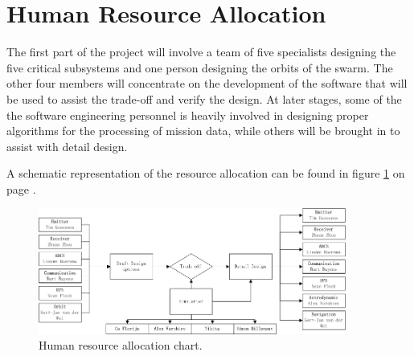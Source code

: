 \section{Human Resource Allocation}
\label{DDHR}
The first part of the project will involve a team of five specialists designing the five critical subsystems and one person designing the orbits of the swarm. The other four members will concentrate on the development of the software that will be used to assist the trade-off and verify the design. At later stages, some of the the software engineering personnel is heavily involved in designing proper algorithms for the processing of mission data, while others will be brought in to assist with detail design. 

A schematic representation of the resource allocation can be found in figure \ref{fig:DDBBHR} on page \pageref{fig:DDBBHR}.

\begin{figure}[ht!]
\begin{center}
\includegraphics[width=0.9\textwidth]{chapters/img/DDBBHR.jpg}
\end{center}
\caption{Human resource allocation chart.}
\label{fig:DDBBHR}
\end{figure}


